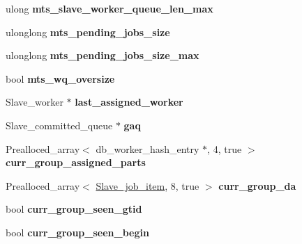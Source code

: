 \begin{DoxyCompactItemize}
ulong {\bfseries mts\+\_\+slave\+\_\+worker\+\_\+queue\+\_\+len\+\_\+max}
\item 
\mbox{\label{classRelay__log__info_ad1d0853d8f0b0e9bd036456c26816897}} 
ulonglong {\bfseries mts\+\_\+pending\+\_\+jobs\+\_\+size}
\item 
\mbox{\label{classRelay__log__info_af8d21621e68c8c66fb6851423a5befa2}} 
ulonglong {\bfseries mts\+\_\+pending\+\_\+jobs\+\_\+size\+\_\+max}
\item 
\mbox{\label{classRelay__log__info_a75a9e8eeaf9a85ebe68b28bbfcc2cb1c}} 
bool {\bfseries mts\+\_\+wq\+\_\+oversize}
\item 
\mbox{\label{classRelay__log__info_af66097d972b7e3696f87ce6dd28d24f9}} 
Slave\+\_\+worker $\ast$ {\bfseries last\+\_\+assigned\+\_\+worker}
\item 
\mbox{\label{classRelay__log__info_a90a2750ad4d1fd8fd8c1d0941c2693dc}} 
Slave\+\_\+committed\+\_\+queue $\ast$ {\bfseries gaq}
\item 
\mbox{\label{classRelay__log__info_a5de6c45607890209c6109ce8cb5bd31c}} 
Prealloced\+\_\+array$<$ db\+\_\+worker\+\_\+hash\+\_\+entry $\ast$, 4, true $>$ {\bfseries curr\+\_\+group\+\_\+assigned\+\_\+parts}
\item 
\mbox{\label{classRelay__log__info_ab2613f277e765f9961054b6660b2b27a}} 
Prealloced\+\_\+array$<$ \mbox{\hyperlink{structslave__job__item}{Slave\+\_\+job\+\_\+item}}, 8, true $>$ {\bfseries curr\+\_\+group\+\_\+da}
\item 
\mbox{\label{classRelay__log__info_a2015f13a3db6c6a141e4bedf9acc6fb6}} 
bool {\bfseries curr\+\_\+group\+\_\+seen\+\_\+gtid}
\item 
\mbox{\label{classRelay__log__info_a003fc0f1dd4d8c31ec8206e75be296fb}} 
bool {\bfseries curr\+\_\+group\+\_\+seen\+\_\+begin}
\item 
\mbox{\label{classRelay__log__info_a81871a0c188dc19ab3b6a88389b7a561}} 

\end{DoxyCompactItemize}
